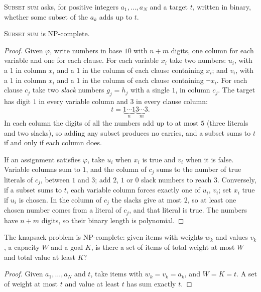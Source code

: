 \textup{\textsc{Subset sum}} asks, for positive integers $a_1,\dots,a_N$ and a target $t$, written in binary, whether some subset of the $a_k$ adds up to $t$.

\begin{theorem}\label{thm:subsetsum}
\textup{\textsc{Subset sum}} is NP-complete.
\end{theorem}

\begin{proof}
Given $\varphi$, write numbers in base $10$ with $n+m$ digits, one column for each variable and one for each clause. For each variable $x_i$ take two numbers: $u_i$, with a $1$ in column $x_i$ and a $1$ in the column of each clause containing $x_i$; and $v_i$, with a $1$ in column $x_i$ and a $1$ in the column of each clause containing $\neg x_i$. For each clause $c_j$ take two \emph{slack} numbers $g_j=h_j$ with a single $1$, in column $c_j$. The target has digit $1$ in every variable column and $3$ in every clause column:
\[
t=\underbrace{1\cdots1}_{n}\underbrace{3\cdots3}_{m}.
\]
In each column the digits of all the numbers add up to at most $5$ (three literals and two slacks), so adding any subset produces no carries, and a subset sums to $t$ if and only if each column does.

If an assignment satisfies $\varphi$, take $u_i$ when $x_i$ is true and $v_i$ when it is false. Variable columns sum to $1$, and the column of $c_j$ sums to the number of true literals of $c_j$, between $1$ and $3$; add $2$, $1$ or $0$ slack numbers to reach $3$. Conversely, if a subset sums to $t$, each variable column forces exactly one of $u_i$, $v_i$; set $x_i$ true if $u_i$ is chosen. In the column of $c_j$ the slacks give at most $2$, so at least one chosen number comes from a literal of $c_j$, and that literal is true. The numbers have $n+m$ digits, so their binary length is polynomial.
\end{proof}

\begin{corollary}\label{cor:knapsack}
The knapsack problem is NP-complete: given items with weights $w_k$ and values $v_k$, a capacity $W$ and a goal $K$, is there a set of items of total weight at most $W$ and total value at least $K$?
\end{corollary}

\begin{proof}
Given $a_1,\dots,a_N$ and $t$, take items with $w_k=v_k=a_k$, and $W=K=t$. A set of weight at most $t$ and value at least $t$ has sum exactly $t$.
\end{proof}

